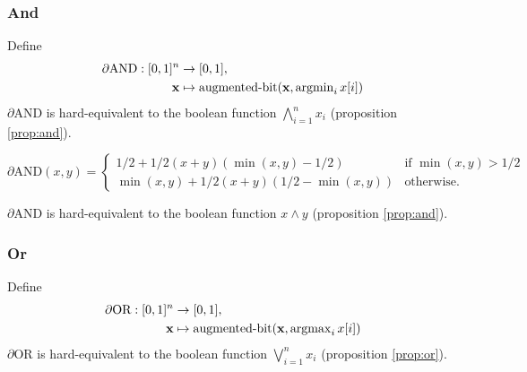 \documentclass{article} %
\begin{document}
\subsubsection{And}

Define
\begin{equation*}
\begin{aligned}
\partial\text{AND}: [0,1]^{n} &\to [0,1], \\
{\bf x} &\mapsto \operatorname{augmented-bit}({\bf x}, \operatorname{argmin}\limits_{i} x[i])
\end{aligned}
\end{equation*}
$\partial${AND} is hard-equivalent to the boolean function $\bigwedge_{i=1}^{n} x_i$ (proposition \ref{prop:and}).

\begin{equation*}
\partial\text{AND}(x, y) =
	\begin{cases}
	1/2 + 1/2(x + y)(\operatorname{min}(x,y) - 1/2) & \text{if } \operatorname{min}(x,y) > 1/2 \\
	\operatorname{min}(x,y) + 1/2(x + y)(1/2 - \operatorname{min}(x,y)) & \text{otherwise.}
	\end{cases}
\end{equation*}

$\partial${AND} is hard-equivalent to the boolean function $x \wedge y$ (proposition \ref{prop:and}).


\subsubsection{Or}

Define
\begin{equation*}
\begin{aligned}
\partial\text{OR}: [0,1]^{n} &\to [0,1], \\
{\bf x} &\mapsto \operatorname{augmented-bit}({\bf x}, \operatorname{argmax}\limits_{i} x[i])
\end{aligned}
\end{equation*}
$\partial${OR} is hard-equivalent to the boolean function $\bigvee_{i=1}^{n} x_i$ (proposition \ref{prop:or}).
\end{document}
